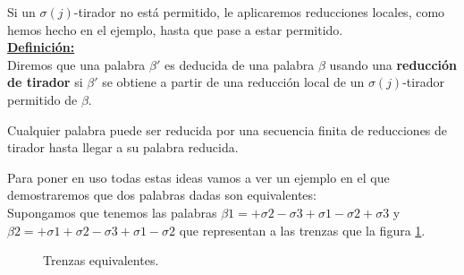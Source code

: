 \documentclass[14pt]{extarticle}
\begin{document}
Si un $\sigma(j)$-tirador no está permitido, le aplicaremos reducciones locales, como hemos hecho en el ejemplo, hasta que pase a estar permitido.\\

\underline{\textbf{Definición:}} \\
Diremos que una palabra $\beta'$ es deducida de una palabra $\beta$ usando una \textbf{reducción de tirador} si $\beta'$ se obtiene a partir de una reducción local de un $\sigma(j)$-tirador permitido de $\beta$.\\

\begin{teo}
	Cualquier palabra puede ser reducida por una secuencia finita de reducciones de tirador hasta llegar a su palabra reducida.
\end{teo}

\bigskip
Para poner en uso todas estas ideas vamos a ver un ejemplo en el que demostraremos que dos palabras dadas son equivalentes:\\
Supongamos que tenemos las palabras $\beta1=+\sigma2-\sigma3+\sigma1-\sigma2+\sigma3$ y $\beta2=+\sigma1+\sigma2-\sigma3+\sigma1-\sigma2$ que representan a las trenzas que la figura \ref{h4}.\\

\begin{figure}[h!]
	\centering
	\caption{Trenzas equivalentes.}
	\label{h4} 
\end{figure}
\end{document}
